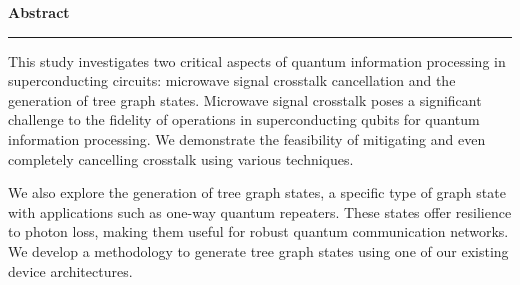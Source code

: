 \thispagestyle{plain}
\vspace*{3cm}
\begin{center}
    \textbf{\LARGE Abstract}

    \rule{5cm}{0.4pt}

    \vspace{1cm}
\end{center}
This study investigates two critical aspects of quantum information processing in superconducting circuits: microwave signal crosstalk cancellation and the generation of tree graph states. 
Microwave signal crosstalk poses a significant challenge to the fidelity of operations in superconducting qubits for quantum information processing.
We demonstrate the feasibility of mitigating and even completely cancelling crosstalk using various techniques.

We also explore the generation of tree graph states, a specific type of graph state with applications such as one-way quantum repeaters.
These states offer resilience to photon loss, making them useful for robust quantum communication networks.
We develop a methodology to generate tree graph states using one of our existing device architectures.

\restoregeometry
\newpage